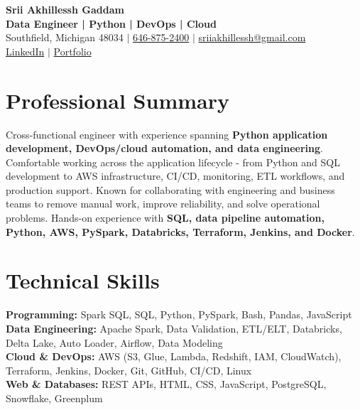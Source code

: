 \documentclass[letterpaper,10pt]{article}
\begin{document}
\fontsize{9.35pt}{10.45pt}\selectfont

\begin{center}
    {\LARGE \textbf{Srii Akhillessh Gaddam}} \\[-1pt]
    \textbf{Data Engineer | Python | DevOps | Cloud} \\[2pt]
    Southfield, Michigan 48034 $|$
    \href{tel:6468752400}{646-875-2400} $|$
    \href{mailto:sriiakhillessh@gmail.com}{sriiakhillessh@gmail.com} \\[1pt]
    \href{https://www.linkedin.com/in/srii-akhiilessh-gaddam-b48668191/}{LinkedIn} $|$
    \href{https://sriiakhillesshg.github.io/portfolio/}{Portfolio}
\end{center}
\vspace{-8pt}

\section{Professional Summary}
\small{Cross-functional engineer with experience spanning \textbf{Python application development, DevOps/cloud automation, and data engineering}. Comfortable working across the application lifecycle - from Python and SQL development to AWS infrastructure, CI/CD, monitoring, ETL workflows, and production support. Known for collaborating with engineering and business teams to remove manual work, improve reliability, and solve operational problems. Hands-on experience with \textbf{SQL, data pipeline automation, Python, AWS, PySpark, Databricks, Terraform, Jenkins, and Docker}.}

\section{Technical Skills}
\small{
\textbf{Programming:} Spark SQL, SQL, Python, PySpark, Bash, Pandas, JavaScript \\
\textbf{Data Engineering:} Apache Spark, Data Validation, ETL/ELT, Databricks, Delta Lake, Auto Loader, Airflow, Data Modeling \\
\textbf{Cloud \& DevOps:} AWS (S3, Glue, Lambda, Redshift, IAM, CloudWatch), Terraform, Jenkins, Docker, Git, GitHub, CI/CD, Linux \\
\textbf{Web \& Databases:} REST APIs, HTML, CSS, JavaScript, PostgreSQL, Snowflake, Greenplum
}

\end{document}
